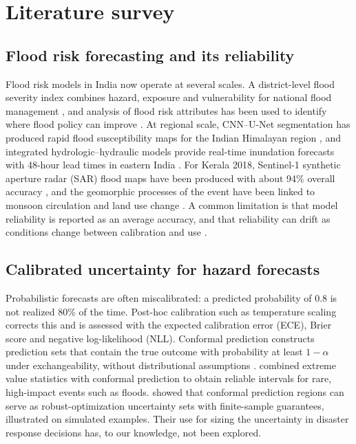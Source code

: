 \documentclass[pdflatex,sn-basic]{sn-jnl}
\theoremstyle{plain}%
\theoremstyle{remark}%
\theoremstyle{definition}%
\begin{document}
\section{Literature survey}\label{sec:lit}

\subsection{Flood risk forecasting and its reliability}

Flood risk models in India now operate at several scales. A district-level flood severity index combines hazard, exposure and vulnerability for national flood management \citep{Saharia2025}, and analysis of flood risk attributes has been used to identify where flood policy can improve \citep{Jain2025}. At regional scale, CNN--U-Net segmentation has produced rapid flood susceptibility maps for the Indian Himalayan region \citep{Rachit2026}, and integrated hydrologic--hydraulic models provide real-time inundation forecasts with 48-hour lead times in eastern India \citep{Rao2024}. For Kerala 2018, Sentinel-1 synthetic aperture radar (SAR) flood maps have been produced with about 94\% overall accuracy \citep{Tiwari2020}, and the geomorphic processes of the event have been linked to monsoon circulation and land use change \citep{Chothodi2024}. A common limitation is that model reliability is reported as an average accuracy, and that reliability can drift as conditions change between calibration and use \citep{Xiao2026}.

\subsection{Calibrated uncertainty for hazard forecasts}

Probabilistic forecasts are often miscalibrated: a predicted probability of 0.8 is not realized 80\% of the time. Post-hoc calibration such as temperature scaling \citep{Guo2017} corrects this and is assessed with the expected calibration error (ECE), Brier score and negative log-likelihood (NLL). Conformal prediction constructs prediction sets that contain the true outcome with probability at least $1-\alpha$ under exchangeability, without distributional assumptions \citep{Vovk2005,Angelopoulos2023}. \citet{Pasche2026} combined extreme value statistics with conformal prediction to obtain reliable intervals for rare, high-impact events such as floods. \citet{Johnstone2021} showed that conformal prediction regions can serve as robust-optimization uncertainty sets with finite-sample guarantees, illustrated on simulated examples. Their use for sizing the uncertainty in disaster response decisions has, to our knowledge, not been explored.
\end{document}
